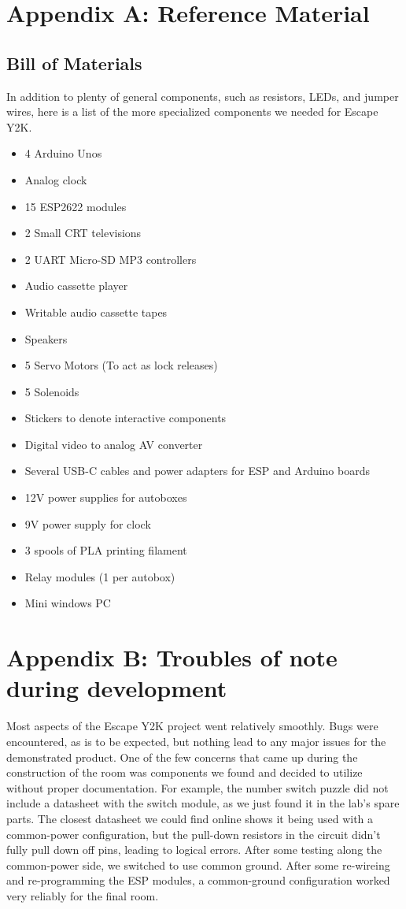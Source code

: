 \documentclass[conference]{IEEEtran}
\begin{document}
\section{Appendix A: Reference Material}

\subsection{Bill of Materials}
In addition to plenty of general components, such as resistors, LEDs, and jumper wires, here is a list of the more specialized 
components we needed for Escape Y2K.

\begin{itemize}
    \item 4 Arduino Unos
    \item Analog clock
    \item 15 ESP2622 modules
    \item 2 Small CRT televisions
    \item 2 UART Micro-SD MP3 controllers
    \item Audio cassette player
    \item Writable audio cassette tapes
    \item Speakers
    \item 5 Servo Motors (To act as lock releases)
    \item 5 Solenoids
    \item Stickers to denote interactive components
    \item Digital video to analog AV converter
    \item Several USB-C cables and power adapters for ESP and Arduino boards
    \item 12V power supplies for autoboxes
    \item 9V power supply for clock
    \item 3 spools of PLA printing filament
    \item Relay modules (1 per autobox)
    \item Mini windows PC
\end{itemize}

\section{Appendix B: Troubles of note during development}

Most aspects of the Escape Y2K project went relatively smoothly. Bugs were encountered, as is to be expected, 
but nothing lead to any major issues for the demonstrated product. One of the few concerns that came up during the 
construction of the room was components we found and decided to utilize without proper documentation. For example, 
the number switch puzzle did not include a datasheet with the switch module, as we just found it in the lab's spare 
parts. The closest datasheet we could find online shows it being used with a common-power configuration, but the 
pull-down resistors in the circuit didn't fully pull down off pins, leading to logical errors. After some testing along 
the common-power side, we switched to use common ground. After some re-wireing and re-programming the ESP modules, 
a common-ground configuration worked very reliably for the final room.
\end{document}
